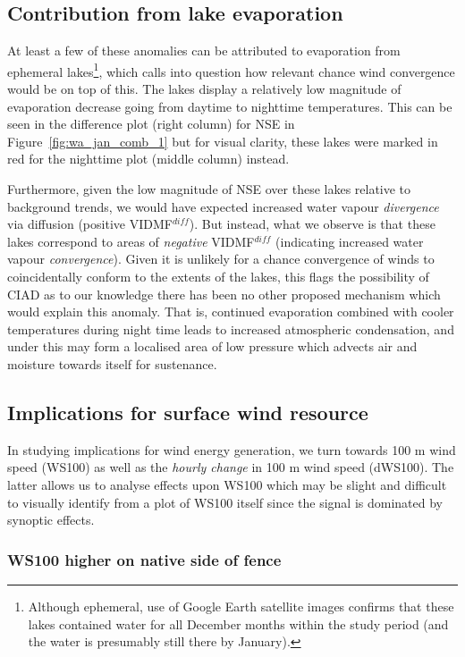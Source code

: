 \subsection{Contribution from lake evaporation}

At least a few of these anomalies can be attributed to evaporation from ephemeral lakes\footnote{Although ephemeral, use of Google Earth satellite images confirms that these lakes contained water for all December months within the study period (and the water is presumably still there by January).}, which calls into question how relevant chance wind convergence would be on top of this. The lakes display a relatively low magnitude of evaporation decrease going from daytime to nighttime temperatures. This can be seen in the difference plot (right column) for \ac{NSE} in Figure~\ref{fig:wa_jan_comb_1} but for visual clarity, these lakes were marked in red for the nighttime plot (middle column) instead.

Furthermore, given the low magnitude of \ac{NSE} over these lakes relative to background trends, we would have expected increased water vapour \textit{divergence} via diffusion (positive \acs{VIDMF}$^{diff}$). But instead, what we observe is that these lakes correspond to areas of \textit{negative} \acs{VIDMF}$^{diff}$ (indicating increased water vapour \textit{convergence}). Given it is unlikely for a chance convergence of winds to coincidentally conform to the extents of the lakes, this flags the possibility of \ac{CIAD} as to our knowledge there has been no other proposed mechanism which would explain this anomaly. That is, continued evaporation combined with cooler temperatures during night time leads to increased atmospheric condensation, and under this may form a localised area of low pressure which advects air and moisture towards itself for sustenance.

\subsection{Implications for surface wind resource} 

In studying implications for wind energy generation, we turn towards 100 m wind speed (\acs{WS100}) as well as the \textit{hourly change} in 100 m wind speed (\acs{dWS100}). The latter allows us to analyse effects upon \acs{WS100} which may be slight and difficult to visually identify from a plot of \ac{WS100} itself since the signal is dominated by synoptic effects.

\subsubsection{WS100 higher on native side of fence}


